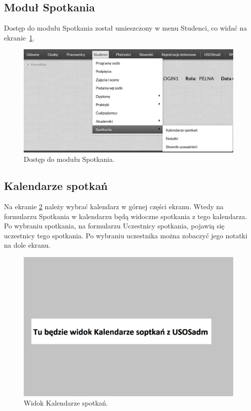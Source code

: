 \documentclass[licencjacka]{pracamgr}
\begin{document}
\subsection{Moduł Spotkania}
Dostęp do modułu Spotkania został umieszczony w menu Studenci, co widać na ekranie~\ref{fig:modspoadm}.

\begin{figure}[!]
  \includegraphics[width=\linewidth]{spotkaniaadm.jpg}
  \caption{Dostęp do modułu Spotkania.}
  \label{fig:modspoadm}
\end{figure}

\subsection{Kalendarze spotkań} %
Na ekranie \ref{fig:kalenadm} należy wybrać kalendarz w górnej części ekranu. Wtedy na formularzu Spotkania w kalendarzu będą widoczne spotkania z tego kalendarza. Po wybraniu spotkania, na formularzu Uczestnicy spotkania, pojawią się uczestnicy tego spotkania. Po wybraniu uczestnika można zobaczyć jego notatki na dole ekranu.

\begin{figure}[!]
  \includegraphics[width=\linewidth]{Kalendarzadm.jpg}
  \caption{Widok Kalendarze spotkań.}
  \label{fig:kalenadm}
\end{figure}
\end{document}

